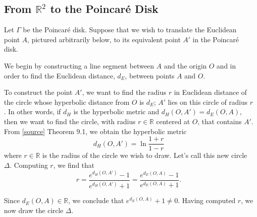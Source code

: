 \documentclass[12pt]{article}
\newcommand{\R}{\mathbb{R}}
\newcommand{\poincare}{Poincar\'{e} }
\theoremstyle{plain}
\theoremstyle{definition}
\begin{document}
\newpage
\begin{appendices}
\section{From $\R^2$ to the \poincare Disk} \label{appendixA}

Let $\Gamma$ be the \poincare disk. Suppose that we wish to translate the Euclidean point $A$, pictured arbitrarily below, to its equivalent point $A'$ in the \poincare disk.

\begin{center}
\end{center}

We begin by constructing a line segment between $A$ and the origin $O$ and in order to find the Euclidean distance, $d_E$, between points $A$ and $O$.

\begin{center}
\end{center}

To construct the point $A'$, we want to find the radius $r$ in Euclidean distance of the circle whose hyperbolic distance from $O$ is $d_E$; $A'$ lies on this circle of radius $r$. In other words, if $d_H$ is the hyperbolic metric and $d_H(O,A') = d_E(O,A)$, then we want to find the circle, with radius $r\in\R$ centered at $O$, that contains $A'$. From \href{}{[source]} Theorem 9.1, we obtain the hyperbolic metric
\[
	d_H(O,A') = \ln\frac{1 + r}{1 - r}
\]
where $r\in\R$ is the radius of the circle we wish to draw. Let's call this new circle $\Delta$. Computing $r$, we find that
\[
	r = \frac{e^{d_H(O,A')} - 1}{e^{d_H(O,A')} + 1} =  \frac{e^{d_E(O,A)} - 1}{e^{d_E(O,A)} + 1}.
\]


Since $d_E(O,A)\in\R$, we conclude that $e^{d_E(O,A)} + 1 \neq 0$. Having computed $r$, we now draw the circle $\Delta$. 


\end{appendices}
\end{document}
